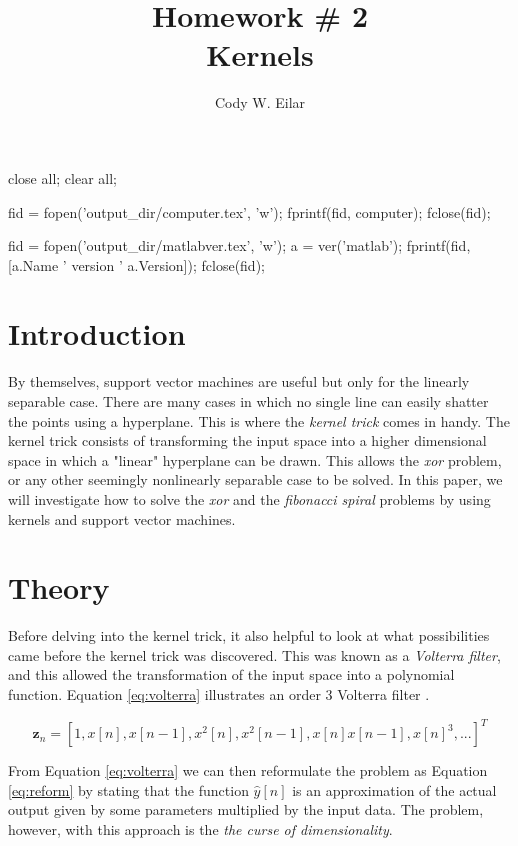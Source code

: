 \documentclass[11pt, twoside]{article}   	%
\title{Homework \# 2 \\ Kernels}
\author{Cody W. Eilar}
\newenvironment{matlab}{\comment}{\endcomment}
\begin{document}
\maketitle


\begin{matlab}
close all; 
clear all;

fid = fopen('output_dir/computer.tex', 'w'); 
fprintf(fid, computer); 
fclose(fid); 

fid = fopen('output_dir/matlabver.tex', 'w'); 
a = ver('matlab'); 
fprintf(fid, [a.Name ' version ' a.Version]); 
fclose(fid); 
\end{matlab}
\section{Introduction} 
By themselves, support vector machines are useful but only for the linearly separable case. There are many cases in which no single line can easily shatter the points 
using a hyperplane. This is where the \textit{kernel trick} comes in handy. The kernel trick consists of transforming the input space into a higher dimensional space in which a "linear"
hyperplane can be drawn. This allows the \textit{xor} problem, or any other seemingly nonlinearly separable case to be solved. In this paper, we will investigate how to solve the \textit{xor} 
and the \textit{fibonacci spiral} problems by using kernels and support vector machines. 

\section{Theory}
Before delving into the kernel trick, it also helpful to look at what possibilities came before the kernel trick was discovered. This was known as a \textit{Volterra filter}, and this allowed
the transformation of the input space into a polynomial function. Equation \ref{eq:volterra} illustrates an order 3 Volterra filter \cite{volterra}.


\begin{equation}
\mathbf{z}_n = [1, x[n], x[n-1], x^2[n], x^2[n-1], x[n] x[n-1], x[n]^3, ...]^T
\label{eq:volterra}
\end{equation}

From Equation \ref{eq:volterra} we can then reformulate the problem as Equation \ref{eq:reform} by stating that the function $\hat{y}[n]$ is an approximation of the actual output
given by some parameters multiplied by the input data. The problem, however, with this approach is the \textit{the curse of dimensionality}.
\end{document}
